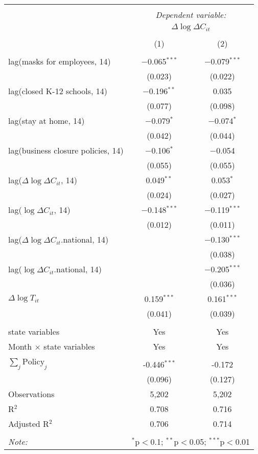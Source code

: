 \begin{tabular}{@{\extracolsep{1pt}}lcc} 
\\[-1.8ex]\hline 
\hline \\[-1.8ex] 
 & \multicolumn{2}{c}{\textit{Dependent variable:}} \\ 
\cline{2-3} 
 & \multicolumn{2}{c}{$\Delta \log \Delta C_{it}$} \\ 
\\[-1.8ex] & (1) & (2)\\ 
\hline \\[-1.8ex] 
 lag(masks for employees, 14) & $-$0.065$^{***}$ & $-$0.079$^{***}$ \\ 
  & (0.023) & (0.022) \\ 
  lag(closed K-12 schools, 14) & $-$0.196$^{**}$ & 0.035 \\ 
  & (0.077) & (0.098) \\ 
  lag(stay at home, 14) & $-$0.079$^{*}$ & $-$0.074$^{*}$ \\ 
  & (0.042) & (0.044) \\ 
  lag(business closure policies, 14) & $-$0.106$^{*}$ & $-$0.054 \\ 
  & (0.055) & (0.055) \\ 
  lag($\Delta \log \Delta C_{it}$, 14) & 0.049$^{**}$ & 0.053$^{*}$ \\ 
  & (0.024) & (0.027) \\ 
  lag($\log \Delta C_{it}$, 14) & $-$0.148$^{***}$ & $-$0.119$^{***}$ \\ 
  & (0.012) & (0.011) \\ 
  lag($\Delta \log \Delta C_{it}$.national, 14) &  & $-$0.130$^{***}$ \\ 
  &  & (0.038) \\ 
  lag($\log \Delta C_{it}$.national, 14) &  & $-$0.205$^{***}$ \\ 
  &  & (0.036) \\ 
  $\Delta \log T_{it}$ & 0.159$^{***}$ & 0.161$^{***}$ \\ 
  & (0.041) & (0.039) \\ 
 \hline \\[-1.8ex] 
state variables & Yes & Yes \\ 
Month $\times$ state variables & Yes & Yes \\ 
\hline \\[-1.8ex] 
$\sum_j \mathrm{Policy}_j$ & -0.446$^{***}$ & -0.172 \\ 
 & (0.096) & (0.127) \\ 
Observations & 5,202 & 5,202 \\ 
R$^{2}$ & 0.708 & 0.716 \\ 
Adjusted R$^{2}$ & 0.706 & 0.714 \\ 
\hline 
\hline \\[-1.8ex] 
\textit{Note:}  & \multicolumn{2}{r}{$^{*}$p$<$0.1; $^{**}$p$<$0.05; $^{***}$p$<$0.01} \\ 
\end{tabular} 